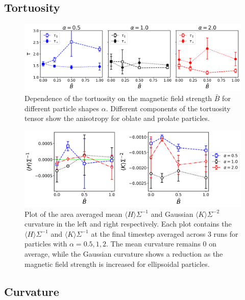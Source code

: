 \subsection{Tortuosity}

\begin{figure}
    \centering
    \includegraphics[scale = 0.4]{figures/results/paper1/tortuosity_compare.png}
    \caption{Dependence of the tortuosity on the magnetic field strength $\bar{B}$ for different particle shapes $\alpha$. 
             Different components of the tortuosity tensor show the anisotropy for oblate and prolate particles.}
    \label{fig:tau_B}
\end{figure}


\begin{figure} 
    \centering 
    \includegraphics[scale = 0.4]{figures/results/paper1/curvature-vs-B_ss.png} 
    \caption{Plot of the area averaged mean $\langle H \rangle \Sigma^{-1}$ and Gaussian 
            $\langle K \rangle \Sigma^{-2}$ curvature in the left and right respectively. Each 
            plot contains the $\langle H \rangle \Sigma^{-1}$ and $\langle K \rangle \Sigma^{-1}$ 
            at the final timestep averaged across 3 runs for particles with $\alpha = 0.5, 1, 2$. 
            The mean curvature remains 0 on average, while the Gaussian 
            curvature shows a reduction as the magnetic field strength is increased for 
            ellipsoidal particles.} 
    \label{fig:curvature-vs-B_ss}
\end{figure}

\subsection{Curvature}

